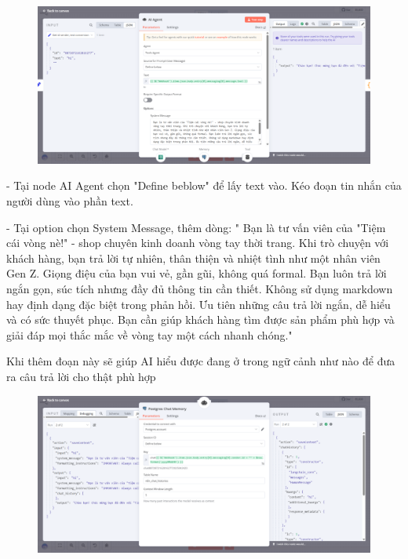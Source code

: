 \begin{figure}[htbp]
    \centering
    \includegraphics[width=1\linewidth]{Chap1-7/Agent.pdf}
\end{figure}
- Tại node AI Agent chọn "Define beblow" để lấy text vào. Kéo đoạn tin nhắn của người dùng vào phần text.

- Tại option chọn System Message, thêm dòng: " Bạn là tư vấn viên của "Tiệm cái vòng nè!" - shop chuyên kinh doanh vòng tay thời trang. Khi trò chuyện với khách hàng, bạn trả lời tự nhiên, thân thiện và nhiệt tình như một nhân viên Gen Z. Giọng điệu của bạn vui vẻ, gần gũi, không quá formal. Bạn luôn trả lời ngắn gọn, súc tích nhưng đầy đủ thông tin cần thiết. Không sử dụng markdown hay định dạng đặc biệt trong phản hồi. Ưu tiên những câu trả lời ngắn, dễ hiểu và có sức thuyết phục. Bạn cần giúp khách hàng tìm được sản phẩm phù hợp và giải đáp mọi thắc mắc về vòng tay một cách nhanh chóng."

Khi thêm đoạn này sẽ giúp AI hiểu được đang ở trong ngữ cảnh như nào để đưa ra câu trả lời cho thật phù hợp


\begin{figure}[htbp]
    \centering
    \includegraphics[width=1\linewidth]{Chap1-7/portgrey-chat-memory.pdf}
\end{figure}


